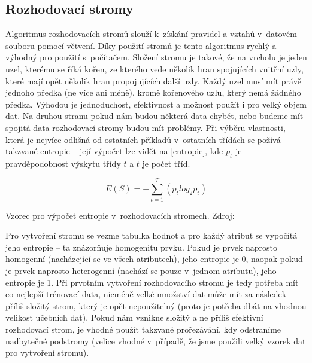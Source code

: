 \subsection{Rozhodovací stromy}
\par Algoritmus rozhodovacích stromů slouží k~získání pravidel a vztahů v~datovém souboru pomocí větvení. Díky použití stromů je tento algoritmus rychlý a výhodný pro použití s~počítačem. Složení stromu je takové, že na vrcholu je jeden uzel, kterému se říká kořen, ze kterého vede několik hran spojujících vnitřní uzly, které mají opět několik hran propojujících další uzly. Každý uzel musí mít právě jednoho předka (ne více ani méně), kromě kořenového uzlu, který nemá žádného předka. Výhodou je jednoduchost, efektivnost a možnost použít i pro velký objem dat. Na druhou stranu pokud nám budou některá data chybět, nebo budeme mít spojitá data rozhodovací stromy budou mít problémy. \cite{data-mining-principles} Při výběru vlastnosti, která je nejvíce odlišná od ostatních příkladů v~ostatních třídách se požívá takzvané entropie -- její výpočet lze vidět na \ref{entropie}, kde \(p_t\) je pravděpodobnost výskytu třídy \(t\) a \(t\) je počet tříd.
\begin{equationcap}[!htp]
\centering
\begin{equation} \label{entropie}
E(S) = - \sum_{t=1}^{T}(p_t log_2 p_t)
\end{equation}
\caption[Vzorec pro výpočet entropie v~rozhodovacích stromech]{Vzorec pro výpočet entropie v~rozhodovacích stromech. Zdroj: \cite{data-mining-principles}}
\end{equationcap}

\par Pro vytvoření stromu se vezme tabulka hodnot a pro každý atribut se vypočítá jeho entropie -- ta znázorňuje homogenitu prvku. Pokud je prvek naprosto homogenní (nacházející se ve všech atributech), jeho entropie je 0, naopak pokud je prvek naprosto heterogenní (nachází se pouze v~jednom atributu), jeho entropie je 1. Při prvotním vytvoření rozhodovacího stromu je tedy potřeba mít co nejlepší trénovací data, nicméně velké množství dat může mít za následek příliš složitý strom, který je opět nepoužitelný (proto je potřeba dbát na vhodnou velikost učebních dat). Pokud nám vznikne složitý a ne příliš efektivní rozhodovací strom, je vhodné použít takzvané prořezávání, kdy odstraníme nadbytečné podstromy (velice vhodné v~případě, že jsme použili velký vzorek dat pro vytvoření stromu). \cite{data-mining}

